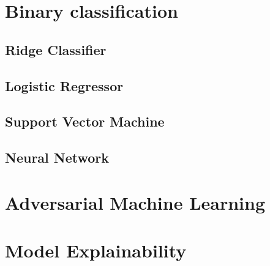 \documentclass{article}
\begin{document}
\section{Binary classification}

\subsection{Ridge Classifier}

\subsection{Logistic Regressor}

\subsection{Support Vector Machine}

\subsection{Neural Network}

\section{Adversarial Machine Learning}

\section{Model Explainability}
\end{document}
